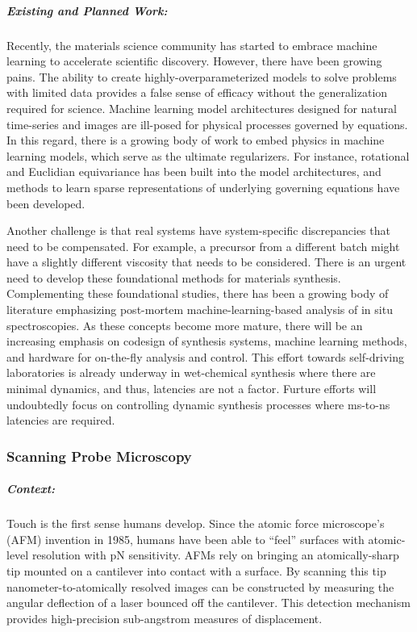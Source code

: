         
\subparagraph*{Existing and Planned Work:} Recently, the materials science community has started to embrace machine learning to accelerate scientific discovery\cite{Butler2018-qo,Schmidt2019-dz,Ramprasad2017-wp}. However, there have been growing pains. The ability to create highly-overparameterized models to solve problems with limited data provides a false sense of efficacy without the generalization required for science. Machine learning model architectures designed for natural time-series and images are ill-posed for physical processes governed by equations. In this regard, there is a growing body of work to embed physics in machine learning models, which serve as the ultimate regularizers. For instance, rotational\cite{Oxley2020-hg,Kalinin2020-xl} and Euclidian equivariance\cite{Smidt_undated-oh,Smidt2020-sh} has been built into the model architectures, and methods to learn sparse representations of underlying governing equations have been developed\cite{Kaheman2020-zt,De_Silva2020-ef,Champion2019-kh}.

Another challenge is that real systems have system-specific discrepancies that need to be compensated\cite{Kaheman2019-yu}. For example, a precursor from a different batch might have a slightly different viscosity that needs to be considered.  There is an urgent need to develop these foundational methods for materials synthesis. Complementing these foundational studies, there has been a growing body of literature emphasizing post-mortem machine-learning-based analysis of in situ spectroscopies\cite{Provence2020-ro,Trejo2019-ph}. As these concepts become more mature, there will be an increasing emphasis on codesign of synthesis systems, machine learning methods, and hardware for on-the-fly analysis and control. This effort towards self-driving laboratories is already underway in wet-chemical synthesis where there are minimal dynamics, and thus, latencies are not a factor\cite{MacLeod2020-mv,Langner2020-ds}. Furture efforts will undoubtedly focus on controlling dynamic synthesis processes where ms-to-ns latencies are required.

\subsubsection{Scanning Probe Microscopy}

\subparagraph*{Context:} Touch is the first sense humans develop. Since the atomic force microscope’s (AFM) invention in 1985\cite{Binnig1986-ig}, humans have been able to “feel” surfaces with atomic-level resolution with pN sensitivity. AFMs rely on bringing an atomically-sharp tip mounted on a cantilever into contact with a surface. By scanning this tip nanometer-to-atomically resolved images can be constructed by measuring the angular deflection of a laser bounced off the cantilever. This detection mechanism provides high-precision sub-angstrom measures of displacement. 

